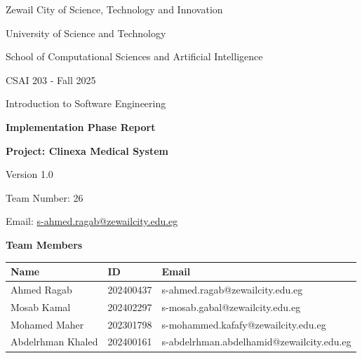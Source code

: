 \documentclass[12pt,a4paper]{article}
\begin{document}
\begin{titlepage}
    \centering
    \vspace*{0.3cm}
    
    {\LARGE Zewail City of Science, Technology and Innovation\par}
    \vspace{0.3cm}
    {\Large University of Science and Technology\par}
    \vspace{0.2cm}
    {\large School of Computational Sciences and Artificial Intelligence\par}
    \vspace{0.2cm}
    {\normalsize CSAI 203 - Fall 2025\par}
    \vspace{0.1cm}
    {\normalsize Introduction to Software Engineering\par}
    \vspace{1cm}
    
    {\Huge\bfseries Implementation Phase Report\par}
    \vspace{0.8cm}
    {\LARGE\bfseries Project: Clinexa Medical System\par}
    \vspace{0.5cm}
    {\large Version 1.0\par}
    
    {\normalsize Team Number: 26\par}
    \vspace{0.2cm}
    {\normalsize Email: \href{mailto:s-ahmed.ragab@zewailcity.edu.eg}{s-ahmed.ragab@zewailcity.edu.eg}\par}
    \vspace{1.5cm}
    
    {\Large\bfseries Team Members\par}
    \vspace{0.8cm}
    
    \begin{tabular}{|l|l|l|}
    \hline
    \textbf{Name} & \textbf{ID} & \textbf{Email} \\ \hline
    Ahmed Ragab & 202400437 & s-ahmed.ragab@zewailcity.edu.eg \\ \hline
    Mosab Kamal & 202402297 & s-mosab.gabal@zewailcity.edu.eg \\ \hline
    Mohamed Maher & 202301798 & s-mohammed.kafafy@zewailcity.edu.eg \\ \hline
    Abdelrhman Khaled & 202400161 & s-abdelrhman.abdelhamid@zewailcity.edu.eg \\ \hline
    \end{tabular}
    
    \vfill
    
\end{titlepage}
\end{document}
